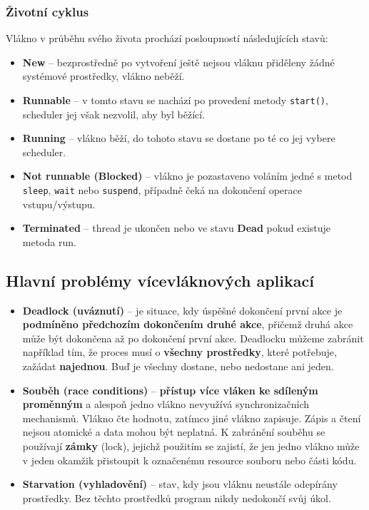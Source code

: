 \subsubsection{Životní cyklus}
Vlákno v průběhu svého života prochází posloupností následujících stavů:
\begin{itemize}
\item \textbf{New} -- bezprostředně po vytvoření ještě nejsou vláknu přiděleny žádné systémové prostředky, vlákno neběží.
\item \textbf{Runnable} -- v tomto stavu se nachází po provedení metody \texttt{start()}, scheduler jej však nezvolil, aby byl běžící.
\item \textbf{Running} -- vlákno běží, do tohoto stavu se dostane po té co jej vybere scheduler.
\item \textbf{Not runnable (Blocked)} -- vlákno je pozastaveno voláním jedné s metod \texttt{sleep}, \texttt{wait} nebo \texttt{suspend}, případně čeká na dokončení operace vstupu/výstupu.
\item \textbf{Terminated} -- thread je ukončen nebo ve stavu \textbf{Dead} pokud existuje metoda run.
\end{itemize}

\subsection{Hlavní problémy vícevláknových aplikací}
\begin{itemize}
\item \textbf{Deadlock (uváznutí)} -- je situace, kdy úspěšné dokončení první akce je \textbf{podmíněno předchozím dokončením druhé akce}, přičemž druhá akce může být dokončena až po dokončení první akce. Deadlocku můžeme zabránit například tím, že proces musí o \textbf{všechny prostředky}, které potřebuje, zažádat \textbf{najednou}. Buď je všechny dostane, nebo nedostane ani jeden. 
\item \textbf{Souběh (race conditions)} -- \textbf{přístup více vláken ke sdíleným proměnným} a alespoň jedno vlákno nevyužívá synchronizačních mechanismů. Vlákno čte hodnotu, zatímco jiné vlákno zapisuje. Zápis a čtení nejsou atomické a data mohou být neplatná. K zabránění souběhu se používají \textbf{zámky} (lock), jejichž použitím se zajistí, že jen jedno vlákno může v jeden okamžik přistoupit k označenému resource souboru nebo části kódu.
\item \textbf{Starvation (vyhladovění)} -- stav, kdy jsou vláknu neustále odepírány prostředky. Bez těchto prostředků program nikdy nedokončí svůj úkol.
\end{itemize}

